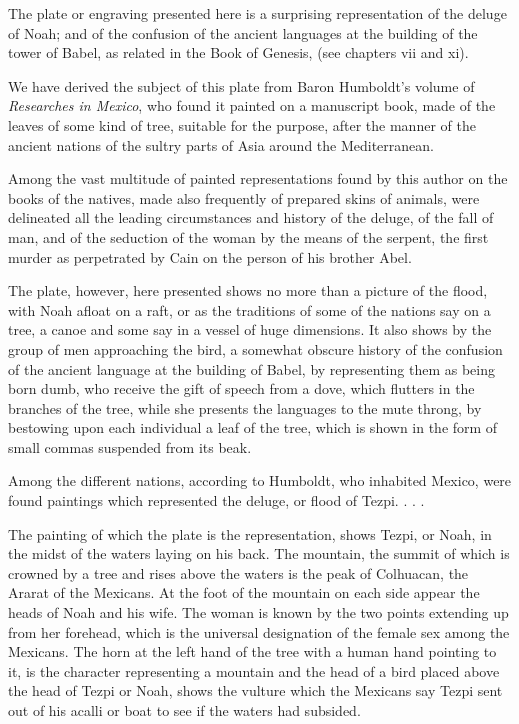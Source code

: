 The plate or engraving presented here is a surprising representation of the deluge of Noah;
and of the confusion of the ancient languages at the building of the tower of Babel, as related
in the Book of Genesis, (see chapters vii and xi).

We have derived the subject of this plate from Baron Humboldt's volume of \textit{Researches in
Mexico}, who found it painted on a manuscript book, made of the leaves of some kind of tree,
suitable for the purpose, after the manner of the ancient nations of the sultry parts of Asia
around the Mediterranean.

Among the vast multitude of painted representations found by this author on the books of the
natives, made also frequently of prepared skins of animals, were delineated all the leading
circumstances and history of the deluge, of the fall of man, and of the seduction of the
woman by the means of the serpent, the first murder as perpetrated by Cain on the person of
his brother Abel.

The plate, however, here presented shows no more than a picture of the flood, with Noah
afloat on a raft, or as the traditions of some of the nations say on a tree, a canoe and some say
in a vessel of huge dimensions. It also shows by the group of men approaching the bird, a
somewhat obscure history of the confusion of the ancient language at the building of Babel,
by representing them as being born dumb, who receive the gift of speech from a dove, which
flutters in the branches of the tree, while she presents the languages to the mute throng, by
bestowing upon each individual a leaf of the tree, which is shown in the form of small
commas suspended from its beak.

Among the different nations, according to Humboldt, who inhabited Mexico, were found
paintings which represented the deluge, or flood of Tezpi. . . .

The painting of which the plate is the representation, shows Tezpi, or Noah, in the midst of
the waters laying on his back. The mountain, the summit of which is crowned by a tree and
rises above the waters is the peak of Colhuacan, the Ararat of the Mexicans. At the foot of
the mountain on each side appear the heads of Noah and his wife. The woman is known by
the two points extending up from her forehead, which is the universal designation of the
female sex among the Mexicans. The horn at the left hand of the tree with a human hand
pointing to it, is the character representing a mountain and the head of a bird placed above
the head of Tezpi or Noah, shows the vulture which the Mexicans say Tezpi sent out of his
acalli or boat to see if the waters had subsided.

